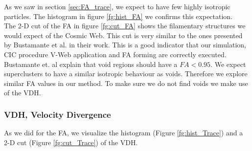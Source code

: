 \documentclass[12pt]{article}
\begin{document}
\begin{par}
As we saw in section \ref{sec:FA_trace}, we
 expect to have few highly isotropic particles.
  The histogram in figure \ref{fg:hist_FA} we confirms this expectation.\\
The 2-D cut of the FA in figure \ref{fg:cut_FA} shows the filamentary structures we would
  expect of the Cosmic Web. This cut is very
   similar to the ones presented by  Bustamante et
   al.  \cite{bustamante_tensor_2015} in their
    work. This is a good indicator that our
     simulation, CIC procedure V-Web application
      and FA forming are correctly executed.
       Bustamante et. al  explain that void
        regions should have a $FA < 0.95$. We expect
         superclusters to have a similar isotropic
          behaviour as voids. Therefore we explore
          similar FA values in our method. To make sure
           we do not find voids we make use of the VDH.
\end{par}


\subsubsection{VDH, Velocity Divergence}
As we did for the FA, we visualize the
 histogram (Figure \ref{fg:hist_Trace}) and a
  2-D cut (Figure \ref{fg:cut_Trace}) of the VDH.
\end{document}
